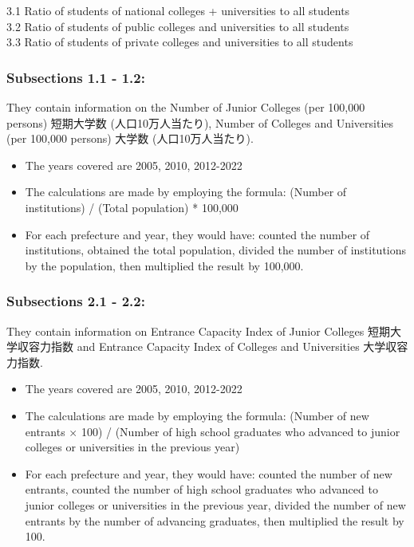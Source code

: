 \documentclass[
]{ltjarticle}
\begin{document}
3.1 Ratio of students of national colleges + universities to all
students\\
3.2 Ratio of students of public colleges and universities to all
students\\
3.3 Ratio of students of private colleges and universities to all
students

\hypertarget{subsections-1.1---1.2-1}{%
\subsubsection{Subsections 1.1 - 1.2:}\label{subsections-1.1---1.2-1}}

They contain information on the Number of Junior Colleges (per 100,000
persons) 短期大学数 (人口10万人当たり), Number of Colleges and
Universities (per 100,000 persons) 大学数 (人口10万人当たり).

\begin{itemize}
\item
  The years covered are 2005, 2010, 2012-2022
\item
  The calculations are made by employing the formula: (Number of
  institutions) / (Total population) * 100,000
\item
  For each prefecture and year, they would have: counted the number of
  institutions, obtained the total population, divided the number of
  institutions by the population, then multiplied the result by 100,000.
\end{itemize}

\hypertarget{subsections-2.1---2.2}{%
\subsubsection{Subsections 2.1 - 2.2:}\label{subsections-2.1---2.2}}

They contain information on Entrance Capacity Index of Junior Colleges
短期大学収容力指数 and Entrance Capacity Index of Colleges and
Universities 大学収容力指数.

\begin{itemize}
\item
  The years covered are 2005, 2010, 2012-2022
\item
  The calculations are made by employing the formula: (Number of new
  entrants × 100) / (Number of high school graduates who advanced to
  junior colleges or universities in the previous year)
\item
  For each prefecture and year, they would have: counted the number of
  new entrants, counted the number of high school graduates who advanced
  to junior colleges or universities in the previous year, divided the
  number of new entrants by the number of advancing graduates, then
  multiplied the result by 100.
\end{itemize}
\end{document}
